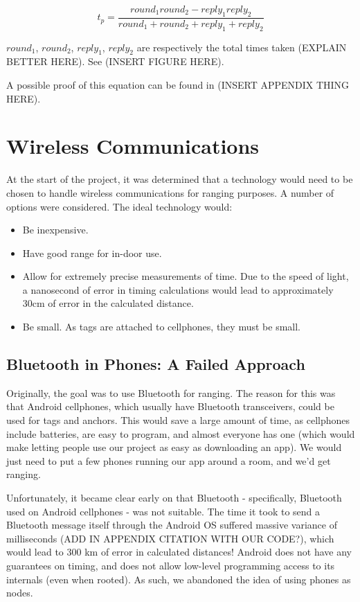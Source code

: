 \[
	t_p = \frac{round_1  round_2 - reply_1 reply_2}{ round_1 + round_2 + reply_1 + reply_2}
\]

$round_1$, $round_2$, $reply_1$, $reply_2$ are respectively the total times taken (EXPLAIN BETTER HERE). See (INSERT FIGURE HERE).
 
A possible proof of this equation can be found in (INSERT APPENDIX THING HERE).

\section{Wireless Communications}
At the start of the project, it was determined that a technology would need to be chosen to handle wireless communications for ranging purposes. A number of options were considered. The ideal technology would:
\begin{itemize}
	\item Be inexpensive.
	\item Have good range for in-door use.
	\item Allow for extremely precise measurements of time. Due to the speed of light, a nanosecond of error in timing calculations would lead to approximately 30cm of error in the calculated distance.
	\item Be small. As tags are attached to cellphones, they must be small.
\end{itemize}

\subsection{Bluetooth in Phones: A Failed Approach}
Originally, the goal was to use Bluetooth for ranging. The reason for this was that Android cellphones, which usually have Bluetooth transceivers, could be used for tags and anchors. This would save a large amount of time, as cellphones include batteries, are easy to program, and almost everyone has one (which would make letting people use our project as easy as downloading an app). We would just need to put a few phones running our app around a room, and we'd get ranging.

Unfortunately, it became clear early on that Bluetooth - specifically, Bluetooth used on Android cellphones - was not suitable. The time it took to send a Bluetooth message itself through the Android OS suffered massive variance of milliseconds (ADD IN APPENDIX CITATION WITH OUR CODE?), which would lead to 300 km of error in calculated distances! Android does not have any guarantees on timing, and does not allow low-level programming access to its internals (even when rooted). As such, we abandoned the idea of using phones as nodes.

